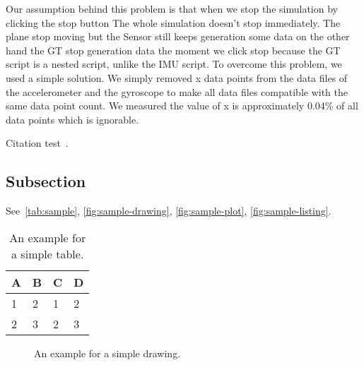 Our assumption behind this problem is that when we stop the simulation by clicking the stop button The whole simulation doesn’t stop immediately. The plane stop moving but the Sensor still keeps generation some data on the other hand the GT stop generation data the moment we click stop because the GT script is a nested script, unlike the IMU script.
To overcome this problem, we used a simple solution.  We simply removed x data points from the data files of the accelerometer and the gyroscope to make all data files compatible with the same data point count. We measured the value of x is approximately 0.04\% of all data points which is ignorable.










































Citation test~\parencite{latex}.

\subsection{Subsection}

See~\autoref{tab:sample}, \autoref{fig:sample-drawing}, \autoref{fig:sample-plot}, \autoref{fig:sample-listing}.

\begin{table}[htpb]
  \caption[Example table]{An example for a simple table.}\label{tab:sample}
  \centering
  \begin{tabular}{l l l l}
    \toprule
      A & B & C & D \\
    \midrule
      1 & 2 & 1 & 2 \\
      2 & 3 & 2 & 3 \\
    \bottomrule
  \end{tabular}
\end{table}

\begin{figure}[htpb]
  \centering
  \caption[Example drawing]{An example for a simple drawing.}\label{fig:sample-drawing}
\end{figure}

